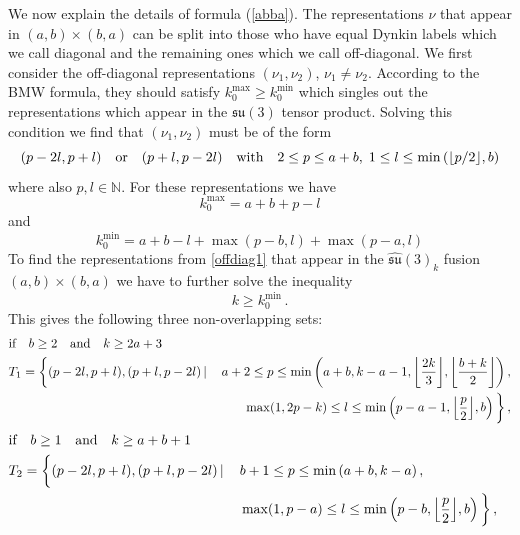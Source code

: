 \documentclass[a4paper,11pt]{article}
\DeclarePairedDelimiter\floor{\lfloor}{\rfloor}
\theoremstyle{plain}
\theoremstyle{definition}
\newcommand{\aff}{\widehat{\mathfrak{su}}(3)_k}
\begin{document}
We now explain the details of formula (\ref{abba}). The representations $\nu$ that appear in $(a,b)\times (b,a)$ can be split into those who have equal Dynkin labels which we call diagonal and the remaining ones which we call off-diagonal. %
We first consider the off-diagonal representations $(\nu_1,\nu_2)$, $\nu_1\ne \nu_2$.
According to the BMW formula, they should  satisfy $k_0^{\text{max}}\geq k_0^{\text{min}}$ which singles out the representations which appear in the $\mathfrak{su}(3)$ tensor product. Solving this condition  we find that $(\nu_1,\nu_2)$ must be of the form
\begin{equation}\label{offdiag1}
    (p-2l,p+l) \quad \text{or} \quad (p+l,p-2l) \quad \text{with}\quad  2\leq p\leq a+b,\;1\leq l\leq \operatorname{min}\left(\floor*{p/2},b\right)
\end{equation}
where also $p,l\in \mathbb{N}$. For these representations we have
\begin{equation}
    k_0^{\text{max}}=a+b+p-l
\end{equation}
and
\begin{equation}
    k_0^{\text{min}}=a+b-l+\operatorname{max}(p-b,l)+\operatorname{max}(p-a,l)
\end{equation}
To find the representations from \eqref{offdiag1} that appear in the $\aff$ fusion $(a,b)\times (b,a)$ we have to further solve the inequality
\begin{equation}
    k \geq k_0^{\text{min}}\,.
\end{equation}
This gives the following three non-overlapping sets:
\begin{align}\label{offdiag2}
  & \text{if}\quad  b\geq 2 \quad \text{and}\quad  k\geq 2a+3  \nonumber \\
   &T_1= \bigg\{(p-2l,p+l),(p+l,p-2l)\,|\, &a+2\leq p\leq \operatorname{min}\left(a+b,k-a-1,\floor*{\frac{2k}{3}},\floor*{\frac{b+k}{2}}\right), \nonumber \\
    & &\operatorname{max}(1,2p-k)\leq  l\leq \operatorname{min}\left(p-a-1,\floor*{\frac{p}{2}},b\right)\bigg\}\, ,
\end{align}
    \begin{align}\label{offdiag3}
   & \text{if} \quad b\geq 1 \quad \text{and} \quad k\geq a+b+1 \nonumber \\
     &  T_2=\bigg\{(p-2l,p+l),(p+l,p-2l)\,|\, &&b+1\leq p\leq \operatorname{min}\left(a+b,k-a\right), \nonumber \\
        & &&\operatorname{max}(1,p-a)\leq  l\leq \operatorname{min}\left(p-b,\floor*{\frac{p}{2}},b\right)\bigg\}\, ,
    \end{align}
\end{document}
